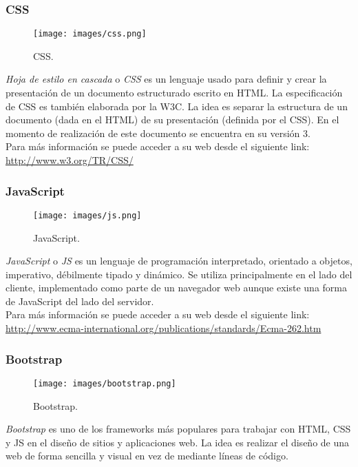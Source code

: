 \subsubsection*{CSS}
\begin{figure}[H]
	\centering
	\texttt{[image: images/css.png]}
	\caption{CSS.}
\end{figure}
\textit{Hoja de estilo en cascada} o \textit{CSS} es un lenguaje usado para definir y crear la presentación de un documento estructurado escrito en HTML. La especificación de CSS es también elaborada por la W3C. La idea es separar la estructura de un documento (dada en el HTML) de su presentación (definida por el CSS). En el momento de realización de este documento se encuentra en su versión 3.\\  

Para más información se puede acceder a su web desde el siguiente link:\\ \url{http://www.w3.org/TR/CSS/}

\subsubsection*{JavaScript}
\begin{figure}[H]
	\centering
	\texttt{[image: images/js.png]}
	\caption{JavaScript.}
\end{figure}
\textit{JavaScript} o \textit{JS} es un lenguaje de programación interpretado, orientado a objetos, imperativo, débilmente tipado y dinámico. Se utiliza principalmente en el lado del cliente, implementado como parte de un navegador web aunque existe una forma de JavaScript del lado del servidor.\\  

Para más información se puede acceder a su web desde el siguiente link:\\ \url{http://www.ecma-international.org/publications/standards/Ecma-262.htm}

\subsubsection*{Bootstrap}
\begin{figure}[H]
	\centering
	\texttt{[image: images/bootstrap.png]}
	\caption{Bootstrap.}
\end{figure}
\textit{Bootstrap} es uno de los frameworks más populares para trabajar con HTML, CSS y JS en el diseño de sitios y aplicaciones web. La idea es realizar el diseño de una web de forma sencilla y visual en vez de mediante líneas de código.\\  

